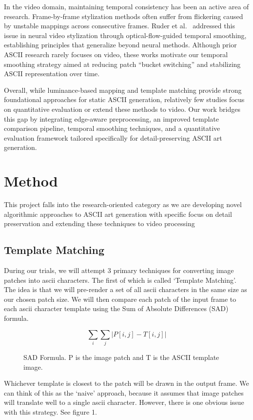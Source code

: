 \documentclass[10pt,twocolumn,letterpaper]{article}
\begin{document}
In the video domain, maintaining temporal consistency has been an active
area of research. Frame-by-frame stylization methods often suffer from
flickering caused by unstable mappings across consecutive frames.
Ruder et al.\ \cite{ruder2016artistic} addressed this issue in neural
video stylization through optical-flow-guided temporal smoothing,
establishing principles that generalize beyond neural methods. Although
prior ASCII research rarely focuses on video, these works motivate our
temporal smoothing strategy aimed at reducing patch ``bucket switching''
and stabilizing ASCII representation over time.

Overall, while luminance-based mapping and template matching provide
strong foundational approaches for static ASCII generation, relatively
few studies focus on quantitative evaluation or extend these methods to
video. Our work bridges this gap by integrating edge-aware preprocessing,
an improved template comparison pipeline, temporal smoothing techniques,
and a quantitative evaluation framework tailored specifically for
detail-preserving ASCII art generation.


\section{Method}
This project falls into the research-oriented category as
we are developing novel algorithmic approaches to ASCII
art generation with specific focus on detail preservation and
extending these techniques to video processing

\subsection{Template Matching}
During our trials, we will attempt 3 primary techniques for converting image patches into ascii characters. The first of which is called ‘Template Matching’. The idea is that we will pre-render a set of all ascii characters in the same size as our chosen patch size. We will then compare each patch of the input frame to each ascii character template using the Sum of Absolute Differences (SAD) formula. 

\begin{figure}[htbp]
\centering
\[
\sum_{i}\sum_{j} |P[i, j] - T[i, j]|
\]
\caption{SAD Formula. P is the image patch and T is the ASCII template image.}
\label{fig:smoothing}
\end{figure}

Whichever template is closest to the patch will be drawn in the output frame. We can think of this as the ‘naive’ approach, because it assumes that image patches will translate well to a single ascii character. However, there is one obvious issue with this strategy. See figure 1. 
\end{document}

